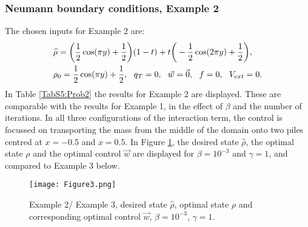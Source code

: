 
\subsubsection{Neumann boundary conditions, Example 2} 
The chosen inputs for Example 2 are:
\begin{align*}
&\widehat \rho = \bigg(\frac{1}{2}\cos(\pi y) + \frac{1}{2}\bigg)(1-t) + t\bigg(-\frac{1}{2}\cos(2 \pi y) + \frac{1}{2}\bigg),\\
&\rho_{0} = \frac{1}{2}\cos(\pi y) + \frac{1}{2},\ \
q_{T} = 0,\ \
\vec{w} = \vec{0},\ \
f =0,\ \
V_{ext} =0.
\end{align*}
In Table \ref{TabS5:Prob2} the results for Example 2 are displayed. These are comparable with the results for Example 1, in the effect of $\beta$ and the number of iterations. In all three configurations of the interaction term, the control is focussed on transporting the mass from the middle of the domain onto two piles centred at $x=-0.5$ and $x=0.5$. In Figure \ref{Ex22DN1}, the desired state $\widehat \rho$, the optimal state $\rho$ and the optimal control $\vec{w}$ are displayed for $\beta = 10^{-3}$ and $\gamma = 1$, and compared to Example 3 below. 
\begin{figure}[h]
	\texttt{[image: Figure3.png]}
	\caption{Example 2/ Example 3, desired state $\widehat \rho$, optimal state $\rho$ and corresponding optimal control $\vec{w}$, $\beta = 10^{-3}$, $\gamma = 1$.}
	\label{Ex22DN1}
\end{figure}

